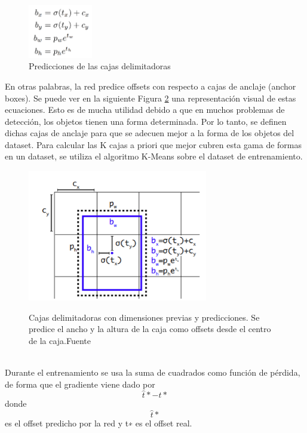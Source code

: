\begin{figure}[h!]
    \centering
    \includegraphics[width=0.25\textwidth]{img/BoundingBoxesFormula.png}
    \caption{Predicciones de las cajas delimitadoras}
    \label{fig:prediccion de bb}
\end{figure}

\newline
En otras palabras, la red predice offsets con respecto a cajas de anclaje (anchor boxes). Se puede ver en la siguiente Figura \ref{fig:cajas delimitdoras} una representación visual de estas ecuaciones. Esto es de mucha utilidad debido a que en muchos problemas de detección, los objetos tienen una forma determinada. Por lo tanto, se definen dichas cajas de anclaje para que se adecuen mejor a la forma de los objetos del dataset. Para calcular las K cajas a priori que mejor cubren esta gama de formas en un dataset, se utiliza el algoritmo K-Means sobre el dataset de entrenamiento.

\begin{figure}
    \centering
    \includegraphics[width=0.7\textwidth]{img/BoundingBoxes.png}\\
    \caption{Cajas delimitadoras con dimensiones previas y predicciones. Se predice el ancho y la altura de la caja como offsets desde el centro de la caja.Fuente \cite{yolov3}}
    \label{fig:cajas delimitdoras}
\end{figure}
\\
Durante el entrenamiento se usa la suma de cuadrados como función de pérdida, de forma que el gradiente viene dado por \[\hat{t} \ast - t\ast \]  donde \[{\hat{t}\ast}\] es el offset predicho por la red y t∗ es el offset real.

